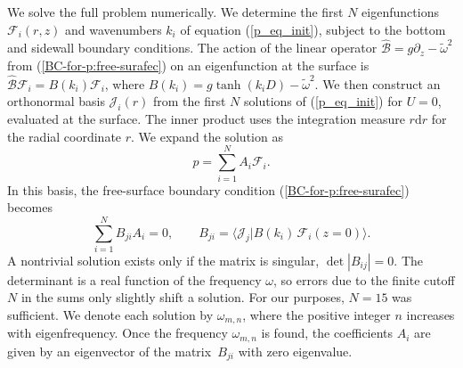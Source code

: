 \documentclass[aps,twocolumn]{revtex4-2}
\begin{document}
We solve the full problem numerically. We determine the first $N$ eigenfunctions ${\mathcal F}_i(r,z)$ and wavenumbers $k_i$ of equation (\ref{p_eq_init}), subject to the bottom and sidewall boundary conditions. The action of the linear operator $\hat {\mathcal B} = g \partial_z - \widetilde\omega^2$ from (\ref{BC-for-p:free-surafec}) on an eigenfunction at the surface is $\hat {\mathcal B} {\mathcal F}_i = B(k_i){\mathcal F}_i$, where $B(k_i) = g\tanh(k_iD) - \widetilde\omega^2$. We then construct an orthonormal basis ${\mathcal J}_i(r)$ from the first $N$ solutions of (\ref{p_eq_init}) for $U=0$, evaluated at the surface. The inner product uses the integration measure $r\mathrm{d}r$ for the radial coordinate $r$. We expand the solution as
\begin{equation}
	p = \sum_{i=1}^N A_i {\mathcal F}_i.
\end{equation}
In this basis, the free-surface boundary condition (\ref{BC-for-p:free-surafec}) becomes
\begin{equation}
	\sum_{i=1}^N B_{ji}A_i = 0,
	\qquad
	B_{ji}
	=
	\big\langle {\mathcal J}_j \big\vert B(k_i)\, {\mathcal F}_i(z=0)\big\rangle.
\end{equation}
A nontrivial solution exists only if the matrix is singular, $\mathop{\mathrm{det}}|B_{ij}| = 0$. The determinant is a real function of the frequency $\omega$, so errors due to the finite cutoff $N$ in the sums only slightly shift a solution. For our purposes, $N=15$ was sufficient. We denote each solution by $\omega_{m,n}$, where the positive integer $n$ increases with eigenfrequency. Once the frequency $\omega_{m,n}$ is found, the coefficients $A_i$ are given by an eigenvector of the matrix~$B_{ji}$ with zero eigenvalue.
\end{document}
